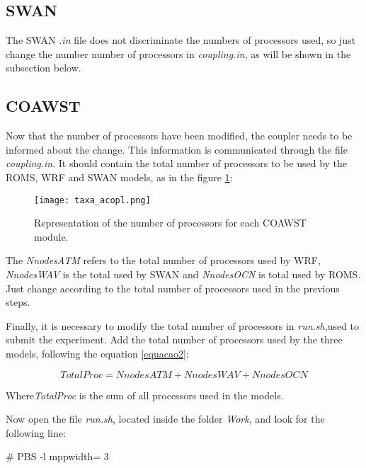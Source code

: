 \subsection{SWAN}

\bigskip The SWAN \textit{.in} file does not discriminate the numbers of processors used, so just change the number
number of processors in \textit{coupling.in}, as will be shown in the subsection below.
\bigskip

\subsection{COAWST}
\bigskip

\noindent Now that the number of processors have been modified, the coupler needs to be informed about the change. 
This information is communicated through the file \textit{coupling.in}. It should contain the total number of processors 
to be used by the ROMS, WRF and SWAN models, as in the figure \textcolor{bleu_cite}{\ref{procscoa}}:
\bigskip

\begin{figure}[H]
    \centering
    \texttt{[image: taxa\_acopl.png]}
    \caption{Representation of the number of processors for each COAWST module.}
    \label{procscoa}
\end{figure}
\bigskip

\noindent The \textit{NnodesATM} refers to the total number of processors used by WRF, \textit{NnodesWAV} is the
total used by SWAN and \textit{NnodesOCN} is total used by ROMS. Just change according to the total number of processors used
in the previous steps.
\bigskip

\noindent Finally, it is necessary to modify the total number of processors in \textit{run.sh},used to submit the experiment.
Add the total number of processors used by the three models, following the equation \textcolor{bleu_cite}{\ref{equacao2}}:
\bigskip

\begin{equation}
TotalProc = NnodesATM + NnodesWAV + NnodesOCN
\label{equacao2}
\end{equation}
\bigskip

\noindent Where\textit{TotalProc} is the sum of all processors used in the models.
\bigskip

\noindent Now open the file \textit{run.sh}, located inside the folder \textit{Work}, and look for the following line:
\bigskip

\begin{bashcode}
\# PBS -l mppwidth= 3
\end{bashcode}
\bigskip

